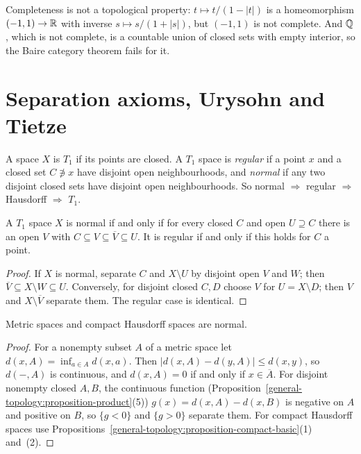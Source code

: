 \begin{counterexample}\label{general-topology:counterexample-completeness-not-topological}
Completeness is not a topological property: $t \mapsto t/(1 - |t|)$ is a homeomorphism $(-1, 1) \to \mathbb{R}$ with inverse $s \mapsto s/(1 + |s|)$, but
$(-1, 1)$ is not complete. And $\mathbb{Q}$, which is not complete, is a countable union of closed sets with empty interior, so the Baire category theorem fails
for it.
\end{counterexample}

\section{Separation axioms, Urysohn and Tietze}\label{general-topology:section-separation}

\begin{definition}\label{general-topology:definition-separation}
A space $X$ is \emph{$T_1$} if its points are closed. A $T_1$ space is \emph{regular} if a point $x$ and a closed set $C \not\ni x$ have disjoint open
neighbourhoods, and \emph{normal} if any two disjoint closed sets have disjoint open neighbourhoods. So normal $\Rightarrow$ regular $\Rightarrow$
Hausdorff $\Rightarrow$ $T_1$.
\end{definition}

\begin{lemma}\label{general-topology:lemma-normal-shrinking}
A $T_1$ space $X$ is normal if and only if for every closed $C$ and open $U \supseteq C$ there is an open $V$ with $C \subseteq V \subseteq \overline{V} \subseteq U$.
It is regular if and only if this holds for $C$ a point.
\end{lemma}

\begin{proof}
If $X$ is normal, separate $C$ and $X \setminus U$ by disjoint open $V$ and $W$; then $\overline{V} \subseteq X \setminus W \subseteq U$. Conversely, for
disjoint closed $C, D$ choose $V$ for $U = X \setminus D$; then $V$ and $X \setminus \overline{V}$ separate them. The regular case is identical.
\end{proof}

\begin{proposition}\label{general-topology:proposition-normal-examples}
Metric spaces and compact Hausdorff spaces are normal.
\end{proposition}

\begin{proof}
For a nonempty subset $A$ of a metric space let $d(x, A) = \inf_{a \in A} d(x, a)$. Then $|d(x, A) - d(y, A)| \leq d(x, y)$, so $d(-, A)$ is continuous, and
$d(x, A) = 0$ if and only if $x \in \overline{A}$. For disjoint nonempty closed $A, B$, the continuous function (Proposition~\ref{general-topology:proposition-product}(5)) $g(x) = d(x, A) - d(x, B)$ is negative on $A$ and positive
on $B$, so $\{g < 0\}$ and $\{g > 0\}$ separate them. For compact Hausdorff spaces use Propositions~\ref{general-topology:proposition-compact-basic}(1)
and~(2).
\end{proof}

